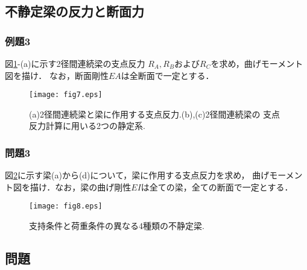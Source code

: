 \documentclass[10pt,a4j]{jarticle}
\begin{document}
\subsection{不静定梁の反力と断面力}
\subsubsection{例題3}
図\ref{fig:fig2_7}-(a)に示す2径間連続梁の支点反力
$R_A, R_B$および$R_C$を求め，曲げモーメント図を描け．
なお，断面剛性$EA$は全断面で一定とする．
\begin{figure}
	\begin{center}
	\texttt{[image: fig7.eps]} 
	\end{center}
	\caption{(a)2径間連続梁と梁に作用する支点反力.(b),(c)2径間連続梁の
	支点反力計算に用いる2つの静定系.} 
	\label{fig:fig2_7}
\end{figure}
\subsubsection{問題3}
図\ref{fig:fig2_8}に示す梁(a)から(d)について，梁に作用する支点反力を求め，
曲げモーメント図を描け．なお，梁の曲げ剛性$EI$は全ての梁，全ての断面で一定とする．
\begin{figure}
	\begin{center}
	\texttt{[image: fig8.eps]} 
	\end{center}
	\caption{支持条件と荷重条件の異なる4種類の不静定梁.} 
	\label{fig:fig2_8}
\end{figure}
\subsection{問題}
\end{document}

